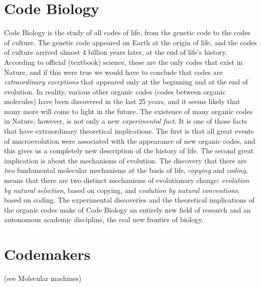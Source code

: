 \documentclass[12pt]{article}
\begin{document}
\section{Code Biology}
Code Biology is the study of all codes of life, from the genetic code to the codes of culture. The genetic code appeared on Earth at the origin of life, and the codes of culture arrived almost 4 billion years later, at the end of life's history. According to official (textbook) science, these are the only codes that exist in Nature, and if this were true we would have to conclude that codes are \textit{extraordinary exceptions} that appeared only at the beginning and at the end of evolution. In reality, various other organic codes (codes between organic molecules) have been discovered in the last 25 years, and it seems likely that many more will come to light in the future. The existence of many organic codes in Nature, however, is not only a new \textit{experimental fact}. It is one of those facts that have extraordinary theoretical implications. The first is that all great events of macroevolution were associated with the appearance of new organic codes, and this gives us a completely new description of the history of life. The second great implication is about the mechanisms of evolution. The discovery that there are \textit{two} fundamental molecular mechanisms at the basis of life, \textit{copying} and \textit{coding}, means that there are two distinct mechanisms of evolutionary change: \textit{evolution by natural selection}, based on copying, and \textit{evolution by natural conventions}, based on coding. The experimental discoveries and the theoretical implications of the organic codes make of Code Biology an entirely new field of research and an autonomous academic discipline, the real new frontier of biology. 


\section{Codemakers} (see Molecular machines) 
\end{document}
